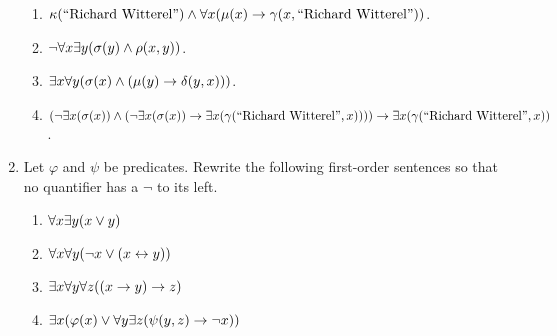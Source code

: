 \begin{enumerate}
\begin{enumerate}
            \item
                \(
                    \kappa(\text{``Richard Witterel''}) \meet
                    \forall x \pn*{\mu(x) \rightarrow \gamma(x, \text{``Richard Witterel''})}
                \).
            \item
                \(\neg \forall x \exists y \pn*{\sigma(y) \meet \rho(x, y)}\).
            \item
                \(\exists x \forall y \pn*{\sigma(x) \meet (\mu(y) \rightarrow \delta(y, x))}\).
            \item
                \(
                    \pn*{\neg \exists x \pn*{\sigma(x)}
                          \meet \pn*{\neg \exists x \pn*{\sigma(x)}
                          \rightarrow \exists x \pn*{\gamma(\text{``Richard Witterel''}, x)}}}
                    \rightarrow \exists x \pn*{\gamma(\text{``Richard Witterel''}, x)}
                \).
        \end{enumerate}
    \item
        Let \(\varphi\) and \(\psi\) be predicates.
        Rewrite the following first-order sentences so that no quantifier has a \(\neg\) to its left.
        \begin{enumerate}
            \item
                \(\forall x \exists y (x \vee y)\)
            \item
                \(\forall x \forall y (\neg x \vee (x \leftrightarrow y))\)
            \item
                \(\exists x \forall y \forall z \pn*{\pn*{x \rightarrow y} \rightarrow z}\)
            \item
                \(\exists x \pn*{\varphi(x) \join \forall y \exists z \pn*{\psi(y, z) \rightarrow \neg x}}\)
        \end{enumerate}
\end{enumerate}

